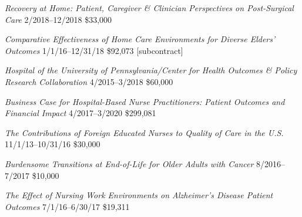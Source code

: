 \documentclass[10pt,]{article}
\begin{document}
{{{{{{{{{{{{{{\textit {Recovery at Home: Patient, Caregiver \& Clinician Perspectives on Post-Surgical Care} \hfill 2/2018--12/2018 \newline
{}	\hfill \$33,000

\textit {Comparative Effectiveness of Home Care Environments for Diverse Elders’ Outcomes} \hfill 1/1/16--12/31/18 \newline
{}	\hfill \$92,073 [subcontract]

\textit {Hospital of the University of Pennsylvania/Center for Health Outcomes \& Policy Research Collaboration} \hfill 4/2015--3/2018 \newline
{}		\hfill \$60,000

\textit {Business Case for Hospital-Based Nurse Practitioners: Patient Outcomes and Financial Impact} \hfill 4/2017--3/2020 \newline
{}	\hfill \$299,081

\textit {The Contributions of Foreign Educated Nurses to Quality of Care in the U.S.} \hfill 11/1/13--10/31/16 \newline
{}	\hfill \$30,000

\textit {Burdensome Transitions at End-of-Life for Older Adults with Cancer} \hfill 8/2016--7/2017 \newline
{}	\hfill \$10,000

\textit {The Effect of Nursing Work Environments on Alzheimer’s Disease Patient Outcomes} \hfill 7/1/16--6/30/17 \newline
{}	\hfill \$19,311

}}}}}}}}}}}}}}
\end{document}

